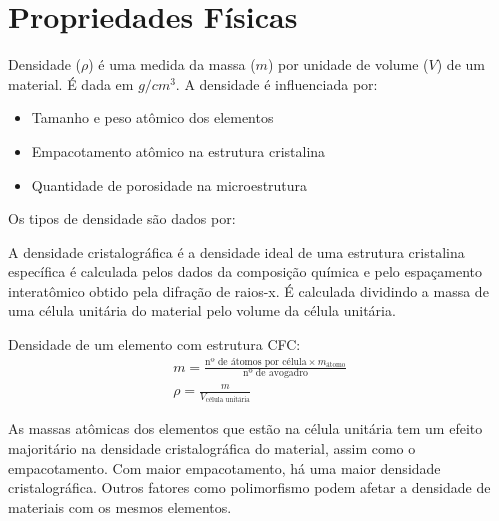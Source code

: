 
\section*{Propriedades Físicas}

\begin{definition}[Densidade]
  Densidade ($\rho$) é uma medida da massa ($m$) por unidade de volume ($V$) de um material. É dada em $g/cm^3$. A densidade é influenciada por:
  \begin{itemize}
    \item Tamanho e peso atômico dos elementos
    \item Empacotamento atômico na estrutura cristalina
    \item Quantidade de porosidade na microestrutura
  \end{itemize}
\end{definition}

Os tipos de densidade são dados por:

\begin{definition}
  A densidade cristalográfica é a densidade ideal de uma estrutura cristalina específica é calculada pelos dados da composição química e pelo espaçamento interatômico obtido pela difração de raios-x. É calculada dividindo a massa de uma célula unitária do material pelo volume da célula unitária.
\end{definition}
\begin{eg}
  Densidade de um elemento com estrutura CFC:
  \begin{gather}
    m = \frac{\text{nº de átomos por célula} \times m_{\text{átomo}}}{\text{nº de avogadro}} \\
    \rho = \frac{m}{V_{\text{célula unitária}}}
  \end{gather}
\end{eg}

As massas atômicas dos elementos que estão na célula unitária tem um efeito majoritário na densidade cristalográfica do material, assim como o empacotamento. Com maior empacotamento, há uma maior densidade cristalográfica. Outros fatores como polimorfismo podem afetar a densidade de materiais com os mesmos elementos.

